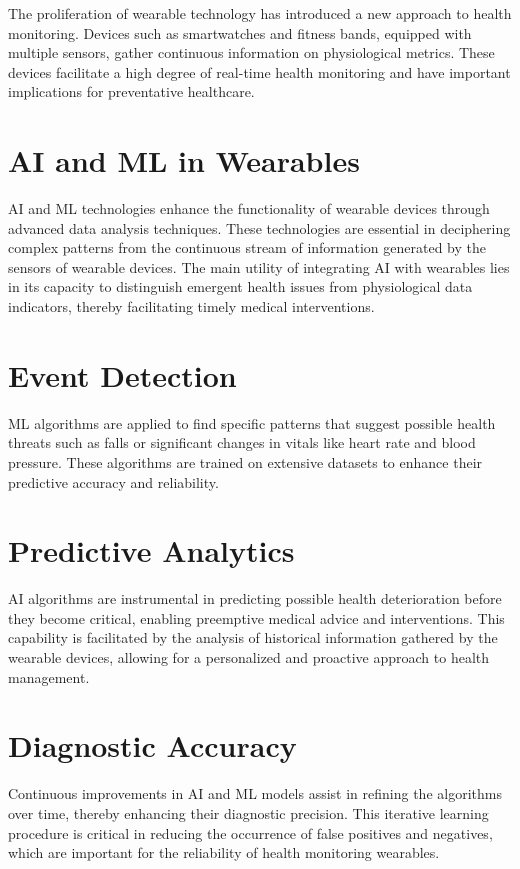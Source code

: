 \noindent{}The proliferation of wearable technology has introduced a new
approach to health monitoring. Devices such as smartwatches and fitness bands,
equipped with multiple sensors, gather continuous information on physiological
metrics. These devices facilitate a high degree of real-time health
monitoring and have important implications for preventative healthcare.
\cite{huhn2022impact}

\section{AI and ML in Wearables}
AI and ML technologies enhance the functionality of wearable devices through
advanced data analysis techniques. These technologies are essential in
deciphering complex patterns from the continuous stream of information generated
by the sensors of wearable devices. The main utility of integrating AI with
wearables lies in its capacity to distinguish emergent health issues from
physiological data indicators, thereby facilitating timely medical
interventions. \cite{jin2019review}
\newpage

\section{Event Detection}
ML algorithms are applied to find specific patterns that suggest possible health
threats such as falls or significant changes in vitals like heart rate and blood
pressure. These algorithms are trained on extensive datasets to enhance their
predictive accuracy and reliability. \cite{buddha2023future}

\section{Predictive Analytics}
AI algorithms are instrumental in predicting possible health deterioration
before they become critical, enabling preemptive medical advice and interventions.
This capability is facilitated by the analysis of historical information
gathered by the wearable devices, allowing for a personalized and proactive
approach to health management. \cite{buddha2023future}

\section{Diagnostic Accuracy}
Continuous improvements in AI and ML models assist in refining the algorithms
over time, thereby enhancing their diagnostic precision. This iterative learning
procedure is critical in reducing the occurrence of false positives and
negatives, which are important for the reliability of health monitoring
wearables. \cite{junaid2022recent}

